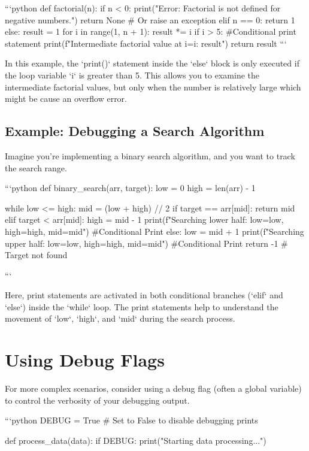 \documentclass{article}
\begin{document}
```python
def factorial(n):
  if n < 0:
    print("Error: Factorial is not defined for negative numbers.")
    return None  # Or raise an exception
  elif n == 0:
    return 1
  else:
    result = 1
    for i in range(1, n + 1):
      result *= i
      if i > 5: #Conditional print statement
          print(f"Intermediate factorial value at i={i}: {result}")
    return result
```

In this example, the `print()` statement inside the `else` block is only executed if the loop variable `i` is greater than 5.  This allows you to examine the intermediate factorial values, but only when the number is relatively large which might be cause an overflow error.

\subsection*{Example: Debugging a Search Algorithm}

Imagine you're implementing a binary search algorithm, and you want to track the search range.

```python
def binary_search(arr, target):
  low = 0
  high = len(arr) - 1

  while low <= high:
    mid = (low + high) // 2
    if target == arr[mid]:
      return mid
    elif target < arr[mid]:
      high = mid - 1
      print(f"Searching lower half: low={low}, high={high}, mid={mid}") #Conditional Print
    else:
      low = mid + 1
      print(f"Searching upper half: low={low}, high={high}, mid={mid}") #Conditional Print
  return -1 # Target not found

```

Here, print statements are activated in both conditional branches (`elif` and `else`) inside the `while` loop. The print statements help to understand the movement of `low`, `high`, and `mid` during the search process.

\section*{Using Debug Flags}

For more complex scenarios, consider using a debug flag (often a global variable) to control the verbosity of your debugging output.

```python
DEBUG = True  # Set to False to disable debugging prints

def process_data(data):
  if DEBUG:
    print("Starting data processing...")
\end{document}
